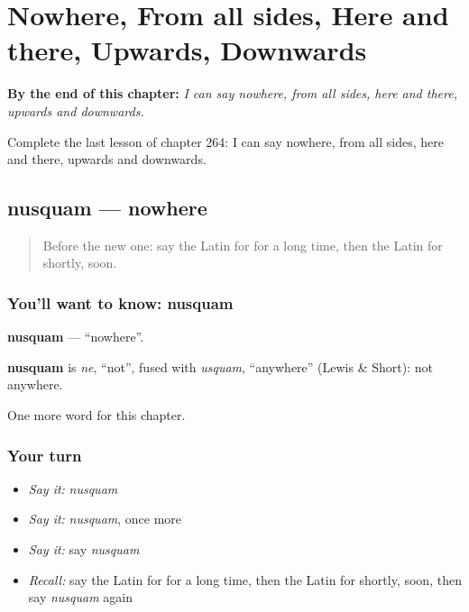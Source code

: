 
\chapter{Nowhere, From all sides, Here and there, Upwards, Downwards}
\label{ch:la-nowhere-from-all-sides-here-and-there-upwards-downwards}

\begin{chapteropening}
\textbf{By the end of this chapter:} \emph{I can say nowhere, from all sides, here and there, upwards and downwards.}

Complete the last lesson of chapter 264: I can say nowhere, from all sides, here and there, upwards and downwards.
\end{chapteropening}

\section[nusquam]{nusquam — nowhere}

\label{lesson:LA-C264-nusquam}



\begin{quote}
Before the new one: say the Latin for for a long time, then the Latin for shortly, soon.
\end{quote}

\subsection*{You'll want to know: nusquam}
\textbf{nusquam} — \textquotedblleft{}nowhere\textquotedblright{}.

\begin{cousinweb}
\textbf{nusquam} is \emph{ne}, \textquotedblleft{}not\textquotedblright{}, fused with \emph{usquam}, \textquotedblleft{}anywhere\textquotedblright{} (Lewis \& Short): not anywhere.
\end{cousinweb}

\begin{grammarlens}[title={What you've built}]
One more word for this chapter.
\end{grammarlens}

\subsection*{Your turn}
\begin{itemize}
\raggedright
  \item \emph{Say it:} \emph{nusquam}
  \item \emph{Say it:} \emph{nusquam}, once more
  \item \emph{Say it:} say \emph{nusquam}
  \item \emph{Recall:} say the Latin for for a long time, then the Latin for shortly, soon, then say \emph{nusquam} again
\end{itemize}

